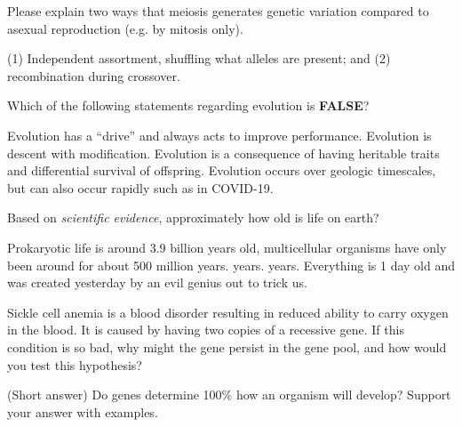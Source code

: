 \documentclass[exam,addpoints,noanswers]{exam}
\begin{document}
\begin{questions}
\clearpage
\question[1] Please explain two ways that meiosis generates genetic variation compared to asexual reproduction (e.g. by mitosis only). 
\begin{solution}[1in]
(1) Independent assortment, shuffling what alleles are present; and (2) recombination during crossover. 
\end{solution}

\question[1] Which of the following statements regarding evolution is \textbf{FALSE}?
\begin{choices}
\CorrectChoice Evolution has a ``drive'' and always acts to improve performance.
\choice Evolution is descent with modification.
\choice Evolution is a consequence of having heritable traits and differential survival of offspring.
\choice Evolution occurs over geologic timescales, but can also occur rapidly such as in COVID-19.
\end{choices}

\question[1] Based on \emph{scientific evidence}, approximately how old is life on earth?
\begin{choices}
\CorrectChoice Prokaryotic life is around 3.9 billion years old, multicellular organisms have only been around for about 500 million years.
 years.
 years.
\choice Everything is 1 day old and was created yesterday by an evil genius out to trick us. 
\end{choices}

\question[1] Sickle cell anemia is a blood disorder resulting in reduced ability to carry oxygen in the blood. It is caused by having two copies of a recessive gene. If this condition is so bad, why might the gene persist in the gene pool, and how would you test this hypothesis?
\begin{solution}[1in]
\end{solution}

\question[1] (Short answer) Do genes determine 100\% how an organism will develop? Support your answer with examples.
\begin{solution}[2in]
\end{solution}




\end{questions}
\end{document}
